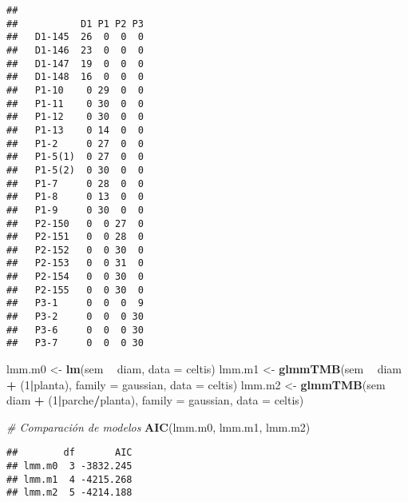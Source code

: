 \documentclass[
]{book}
\newenvironment{Shaded}{\begin{snugshade}}{\end{snugshade}}
\newcommand{\CommentTok}[1]{\textcolor[rgb]{0.56,0.35,0.01}{\textit{#1}}}
\newcommand{\DataTypeTok}[1]{\textcolor[rgb]{0.13,0.29,0.53}{#1}}
\newcommand{\DecValTok}[1]{\textcolor[rgb]{0.00,0.00,0.81}{#1}}
\newcommand{\KeywordTok}[1]{\textcolor[rgb]{0.13,0.29,0.53}{\textbf{#1}}}
\newcommand{\NormalTok}[1]{#1}
\newcommand{\OperatorTok}[1]{\textcolor[rgb]{0.81,0.36,0.00}{\textbf{#1}}}
\newcommand{\StringTok}[1]{\textcolor[rgb]{0.31,0.60,0.02}{#1}}
\begin{document}
\begin{Shaded}
\end{Shaded}

\begin{verbatim}
##          
##           D1 P1 P2 P3
##   D1-145  26  0  0  0
##   D1-146  23  0  0  0
##   D1-147  19  0  0  0
##   D1-148  16  0  0  0
##   P1-10    0 29  0  0
##   P1-11    0 30  0  0
##   P1-12    0 30  0  0
##   P1-13    0 14  0  0
##   P1-2     0 27  0  0
##   P1-5(1)  0 27  0  0
##   P1-5(2)  0 30  0  0
##   P1-7     0 28  0  0
##   P1-8     0 13  0  0
##   P1-9     0 30  0  0
##   P2-150   0  0 27  0
##   P2-151   0  0 28  0
##   P2-152   0  0 30  0
##   P2-153   0  0 31  0
##   P2-154   0  0 30  0
##   P2-155   0  0 30  0
##   P3-1     0  0  0  9
##   P3-2     0  0  0 30
##   P3-6     0  0  0 30
##   P3-7     0  0  0 30
\end{verbatim}

\begin{Shaded}
\begin{Highlighting}[]
\NormalTok{lmm.m0 <-}\StringTok{ }\KeywordTok{lm}\NormalTok{(sem }\OperatorTok{~}\StringTok{ }\NormalTok{diam, }\DataTypeTok{data =}\NormalTok{ celtis)}
\NormalTok{lmm.m1 <-}\StringTok{ }\KeywordTok{glmmTMB}\NormalTok{(sem }\OperatorTok{~}\StringTok{ }\NormalTok{diam }\OperatorTok{+}\StringTok{ }\NormalTok{(}\DecValTok{1}\OperatorTok{|}\NormalTok{planta), }\DataTypeTok{family =}\NormalTok{ gaussian, }\DataTypeTok{data =}\NormalTok{ celtis)}
\NormalTok{lmm.m2 <-}\StringTok{ }\KeywordTok{glmmTMB}\NormalTok{(sem }\OperatorTok{~}\StringTok{ }\NormalTok{diam }\OperatorTok{+}\StringTok{ }\NormalTok{(}\DecValTok{1}\OperatorTok{|}\NormalTok{parche}\OperatorTok{/}\NormalTok{planta), }\DataTypeTok{family =}\NormalTok{ gaussian, }\DataTypeTok{data =}\NormalTok{ celtis)}

\CommentTok{# Comparación de modelos}
\KeywordTok{AIC}\NormalTok{(lmm.m0, lmm.m1, lmm.m2)}
\end{Highlighting}
\end{Shaded}

\begin{verbatim}
##        df       AIC
## lmm.m0  3 -3832.245
## lmm.m1  4 -4215.268
## lmm.m2  5 -4214.188
\end{verbatim}
\end{document}
